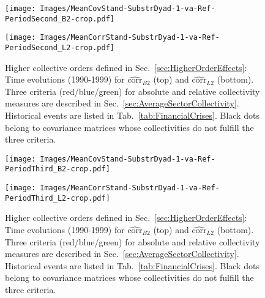 \documentclass[aps, pra, groupedaddress, showkeys, twocolumn, floatfix, 10pt]{revtex4-2}
\newcommand*\meanNONDiag[1]{\widehat{#1}}
\begin{document}
%
\begin{figure*}[!htb]
	\centering
	\begin{minipage}{1.0\textwidth}
		\subfloat%
		{\texttt{[image: Images/MeanCovStand-SubstrDyad-1-va-Ref-PeriodSecond\_B2-crop.pdf]}
		}\par
		\subfloat%
		{\texttt{[image: Images/MeanCorrStand-SubstrDyad-1-va-Ref-PeriodSecond\_L2-crop.pdf]}
		}%
	\end{minipage}%
	\caption{\label{subfig:Main:MeanValCovP2_BL2}Higher collective orders defined in Sec.~\ref{sec:HigherOrderEffects}: Time evolutions (1990-1999) for $\meanNONDiag{\text{corr}}_{B2}$ (top) and $\meanNONDiag{\text{corr}}_{L2}$ (bottom).
		Three criteria (red/blue/green) for absolute and relative collectivity measures are described in Sec.~\ref{sec:AverageSectorCollectivity}. Historical events are listed in Tab.~\ref{tab:FinancialCrises}. Black dots belong to covariance matrices whose collectivities do not fulfill the three criteria.}
\end{figure*}
%



%
\begin{figure*}[!htb]
	\centering
	\begin{minipage}{1.0\textwidth}
		\subfloat%
		{\texttt{[image: Images/MeanCovStand-SubstrDyad-1-va-Ref-PeriodThird\_B2-crop.pdf]}
		}\par
		\subfloat%
		{\texttt{[image: Images/MeanCorrStand-SubstrDyad-1-va-Ref-PeriodThird\_L2-crop.pdf]}
		}%
	\end{minipage}%
	\caption{\label{subfig:Main:MeanValCovP3_BL2}Higher collective orders defined in Sec.~\ref{sec:HigherOrderEffects}: Time evolutions (1990-1999) for $\meanNONDiag{\text{corr}}_{B2}$ (top) and $\meanNONDiag{\text{corr}}_{L2}$ (bottom).
		Three criteria (red/blue/green) for absolute and relative collectivity measures are described in Sec.~\ref{sec:AverageSectorCollectivity}. Historical events are listed in Tab.~\ref{tab:FinancialCrises}. Black dots belong to covariance matrices whose collectivities do not fulfill the three criteria.}
\end{figure*}
%
\end{document}
